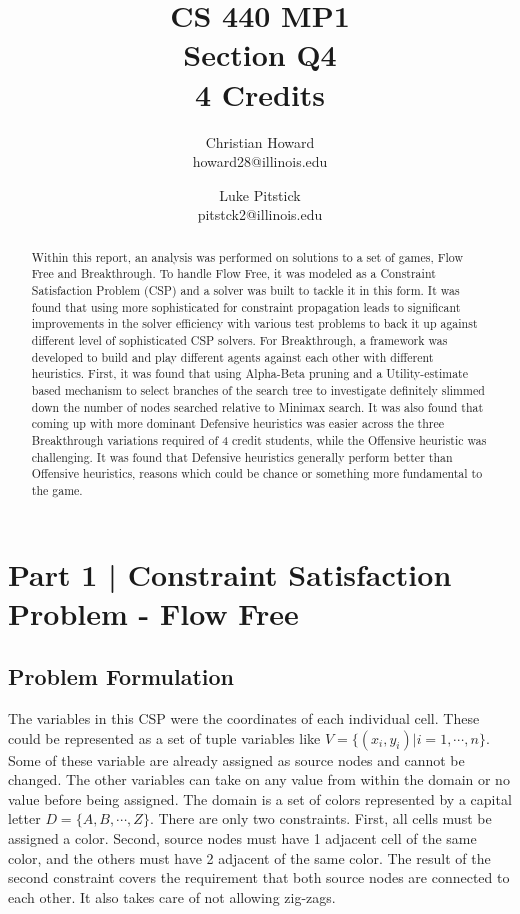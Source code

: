 \documentclass{article}[12pt]
\title{CS 440 MP1 \\ Section Q4 \\ 4 Credits}
\author{
Christian Howard \\ howard28@illinois.edu
\and
Luke Pitstick \\ pitstck2@illinois.edu
}
\date{} %
\begin{document}
   
   \maketitle
   \begin{abstract}
   Within this report, an analysis was performed on solutions to a set of games, Flow Free and Breakthrough. To handle Flow Free, it was modeled as a Constraint Satisfaction Problem (CSP) and a solver was built to tackle it in this form. It was found that using more sophisticated for constraint propagation leads to significant improvements in the solver efficiency with various test problems to back it up against different level of sophisticated CSP solvers. For Breakthrough, a framework was developed to build and play different agents against each other with different heuristics. First, it was found that using Alpha-Beta pruning and a Utility-estimate based mechanism to select branches of the search tree to investigate definitely slimmed down the number of nodes searched relative to Minimax search. It was also found that coming up with more dominant Defensive heuristics was easier across the three Breakthrough variations required of 4 credit students, while the Offensive heuristic was challenging. It was found that Defensive heuristics generally perform better than Offensive heuristics, reasons which could be chance or something more fundamental to the game.
   \end{abstract}
   \newpage
   
   \tableofcontents
   \newpage
   
   \section{Part 1 | Constraint Satisfaction Problem - Flow Free}
   \subsection{Problem Formulation}
   The variables in this CSP were the coordinates of each individual cell. These could be represented as a set of tuple variables like $V = \lbrace (x_i,y_i) | i = 1, \cdots, n \rbrace$. Some of these variable are already assigned as source nodes and cannot be changed. The other variables can take on any value from within the domain or no value before being assigned. The domain is a set of colors represented by a capital letter $D = \lbrace A, B, \cdots, Z \rbrace$. There are only two constraints. First, all cells must be assigned a color. Second, source nodes must have 1 adjacent cell of the same color, and the others must have 2 adjacent of the same color. The result of the second constraint covers the requirement that both source nodes are connected to each other. It also takes care of not allowing zig-zags.
   
\end{document}
